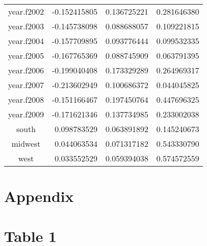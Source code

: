 \documentclass[]{article}
\begin{document}
\begin{longtable}{crrr}
year.f2002 & -0.152415805 & 0.136725221 & 0.281646380 \\ 
year.f2003 & -0.145738098 & 0.088688057 & 0.109221815 \\ 
year.f2004 & -0.157709895 & 0.093776444 & 0.099532335 \\ 
year.f2005 & -0.167765369 & 0.088745909 & 0.063791395 \\ 
year.f2006 & -0.199040408 & 0.173329289 & 0.264969317 \\ 
year.f2007 & -0.213602949 & 0.100686372 & 0.044045825 \\ 
year.f2008 & -0.151166467 & 0.197450764 & 0.447696325 \\ 
year.f2009 & -0.171621346 & 0.137734985 & 0.233002038 \\ 
south & 0.098783529 & 0.063891892 & 0.145240673 \\ 
midwest & 0.044063534 & 0.071317182 & 0.543330790 \\ 
west & 0.033552529 & 0.059394038 & 0.574572559 \\ 
\bottomrule
\end{longtable}

\hypertarget{appendix}{%
\section{Appendix}\label{appendix}}

\hypertarget{table-1}{%
\section{Table 1}\label{table-1}}
\end{document}
